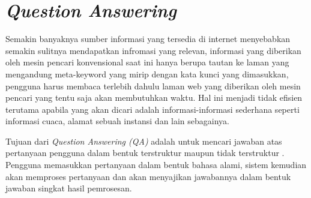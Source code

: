 \section{\textit{Question Answering}}
Semakin banyaknya sumber informasi yang tersedia di internet menyebabkan semakin sulitnya mendapatkan infromasi yang relevan, informasi yang diberikan oleh mesin pencari konvensional saat ini hanya berupa tautan ke laman yang mengandung meta-keyword yang mirip dengan kata kunci yang dimasukkan, pengguna harus membaca terlebih dahulu laman web yang diberikan oleh mesin pencari yang tentu saja akan membutuhkan waktu. Hal ini menjadi tidak efisien terutama apabila yang akan dicari adalah informasi-informasi sederhana seperti informasi cuaca, alamat sebuah instansi dan lain sebagainya. 

Tujuan dari \emph{Question Answering (QA)} adalah untuk mencari jawaban atas pertanyaan pengguna dalam bentuk terstruktur maupun tidak terstruktur \citep*{moussa_kader}. Pengguna memasukkan pertanyaan dalam bentuk bahasa alami, sistem kemudian akan memproses pertanyaan dan akan menyajikan jawabannya dalam bentuk jawaban singkat hasil pemrosesan.

